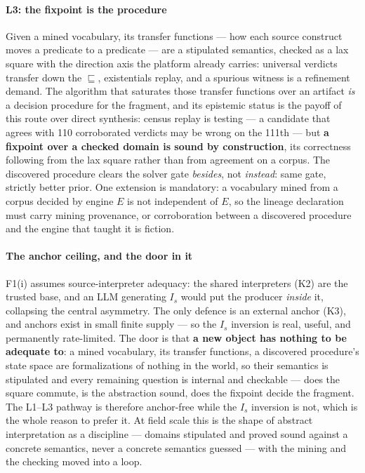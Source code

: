 \paragraph{L3: the fixpoint is the procedure}
Given a mined vocabulary, its transfer functions --- how each source
construct moves a predicate to a predicate --- are a stipulated
semantics, checked as a lax square with the direction axis the
platform already carries: universal verdicts transfer down the
$\sqsubseteq$, existentials replay, and a spurious witness is a
refinement demand. The algorithm that saturates those transfer
functions over an artifact \emph{is} a decision procedure for the
fragment, and its epistemic status is the payoff of this route over
direct synthesis: census replay is testing --- a candidate that
agrees with 110 corroborated verdicts may be wrong on the 111th ---
but \textbf{a fixpoint over a checked domain is sound by
construction}, its correctness following from the lax square rather
than from agreement on a corpus. The discovered procedure clears the
solver gate \emph{besides}, not \emph{instead}: same gate, strictly
better prior. One extension is mandatory: a vocabulary mined from a
corpus decided by engine $E$ is not independent of $E$, so the
lineage declaration must carry mining provenance, or corroboration
between a discovered procedure and the engine that taught it is
fiction.

\paragraph{The anchor ceiling, and the door in it}
F1(i) assumes source-interpreter adequacy: the shared interpreters
(K2) are the trusted base, and an LLM generating $I_s$ would put the
producer \emph{inside} it, collapsing the central asymmetry. The
only defence is an external anchor (K3), and anchors exist in small
finite supply --- so the $I_s$ inversion is real, useful, and
permanently rate-limited. The door is that \textbf{a new object has
nothing to be adequate to}: a mined vocabulary, its transfer
functions, a discovered procedure's state space are formalizations
of nothing in the world, so their semantics is stipulated and every
remaining question is internal and checkable --- does the square
commute, is the abstraction sound, does the fixpoint decide the
fragment. The L1--L3 pathway is therefore anchor-free while the
$I_s$ inversion is not, which is the whole reason to prefer it. At
field scale this is the shape of abstract interpretation as a
discipline --- domains stipulated and proved sound against a
concrete semantics, never a concrete semantics guessed --- with the
mining and the checking moved into a loop.

